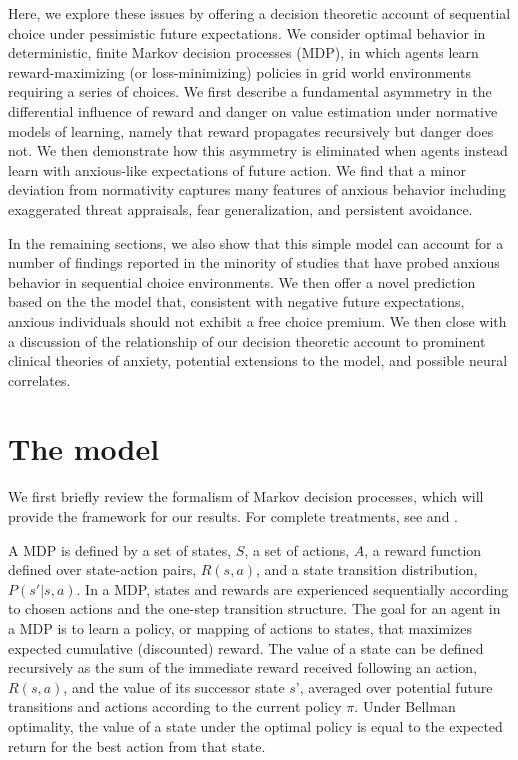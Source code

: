 \documentclass[11pt]{article} %
\begin{document}
Here, we explore these issues by offering a decision theoretic account of sequential choice under pessimistic future expectations. We consider optimal behavior in deterministic, finite Markov decision processes (MDP), in which agents learn reward-maximizing (or loss-minimizing) policies in grid world environments requiring a series of choices. We first describe a fundamental asymmetry in the differential influence of reward and danger on value estimation under normative models of learning, namely that reward propagates recursively but danger does not. We then demonstrate how this asymmetry is eliminated when agents instead learn with anxious-like expectations of future action. We find that a minor deviation from normativity captures many features of anxious behavior including exaggerated threat appraisals, fear generalization, and persistent avoidance.

In the remaining sections, we also show that this simple model can account for a number of findings reported in the minority of studies that have probed anxious behavior in sequential choice environments. We then offer a novel prediction based on the the model that, consistent with negative future expectations, anxious individuals should not exhibit a free choice premium. We then close with a discussion of the relationship of our decision theoretic account to prominent clinical theories of anxiety, potential extensions to the model, and possible neural correlates.

\section{The model}

We first briefly review the formalism of Markov decision processes, which will provide the framework for our results. For complete treatments, see \cite{SuttonBarto2018} and \cite{bertsekas2005}.

A MDP is defined by a set of states, $S$, a set of actions, $A$, a reward function defined over state-action pairs, $R(s,a)$, and a state transition distribution, $P(s'|s,a)$. In a MDP, states and rewards are experienced sequentially according to chosen actions and the one-step transition structure. The goal for an agent in a MDP is to learn a policy, or mapping of actions to states, that maximizes expected cumulative (discounted) reward. The value of a state can be defined recursively as the sum of the immediate reward received following an action, $R(s, a)$, and the value of its successor state $s’$, averaged over potential future transitions and actions according to the current policy $\pi$. Under Bellman optimality, the value of a state under the optimal policy is equal to the expected return for the best action from that state.
\end{document}
